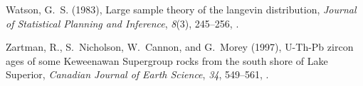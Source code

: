 \documentclass[draft,gc]{AGUTeX}
\begin{document}
\begin{article}
\begin{thebibliography}{24}
Watson, G.~S. (1983), Large sample theory of the langevin distribution,
  \textit{Journal of Statistical Planning and Inference}, \textit{8}(3),
  245--256, .

Zartman, R., S.~Nicholson, W.~Cannon, and G.~Morey (1997), {U-Th-Pb} zircon
  ages of some {K}eweenawan {S}upergroup rocks from the south shore of {L}ake
  {S}uperior, \textit{Canadian Journal of Earth Science}, \textit{34},
  549--561, .

\end{thebibliography}




%

%
%
\end{article}
%
%
%
%
%
%
\end{document}
